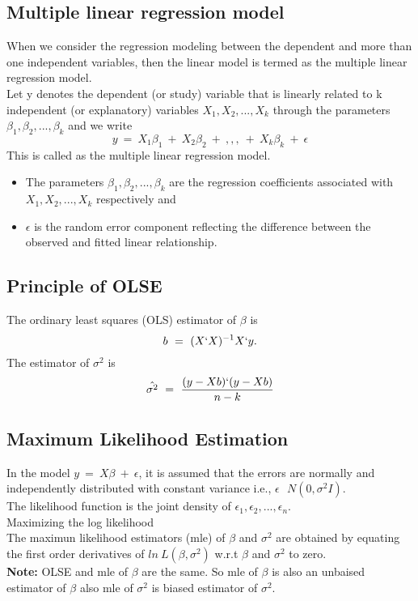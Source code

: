 \subsection*{Multiple linear regression model}
When we consider the regression modeling between the
dependent and more than one independent variables, then the
linear model is termed as the multiple linear regression model.\\
Let y denotes the dependent (or study) variable that is linearly
related to k independent (or explanatory) variables $X_1,X_2,...,X_k$ through the parameters $\beta_1,\beta_2,...,\beta_k$ and we write
\[ y\ =\ X_1\beta_1 \ +\ X_2\beta_2 \ +\ ,,, \ +\ X_k\beta_k\  +\ \epsilon \]
This is called as the multiple linear regression model.
\begin{itemize}
    \item The parameters $\beta_1,\beta_2,...,\beta_k$ are the regression coefficients associated with $X_1,X_2,...,X_k$ respectively and
    \item $\epsilon$ is the random error component reflecting the difference between the observed and fitted linear relationship.
\end{itemize}

\subsection*{Principle of OLSE}
The ordinary least squares (OLS) estimator of $\beta$ is
\[ b\ =\ (X`X)^{-1}X`y. \]
The estimator of $\sigma^2$ is
\[ \hat{\sigma^2}\ =\ \frac{(y-Xb)`(y-Xb)}{n-k} \]

\subsection*{Maximum Likelihood Estimation}
In the model $y\ =\ X\beta\ +\ \epsilon$, it is assumed that the errors are normally and independently distributed with constant variance i.e., $\epsilon\ ~\ N(0,\sigma^2I) $.\\
The likelihood function is the joint density of $\epsilon_1,\epsilon_2,...,\epsilon_n$.\\
Maximizing the log likelihood\\
The maximun likelihood estimators (mle) of $\beta$ and $\sigma^2$ are obtained by equating the first order derivatives of $ln\ L(\beta,\sigma^2)$ w.r.t $\beta$ and $\sigma^2$ to zero.\\
\textbf{Note:} OLSE and mle of $\beta$ are the same. So mle of $\beta$ is also an unbaised estimator of $\beta$ also
mle of $\sigma^2$ is biased estimator of $\sigma^2$.